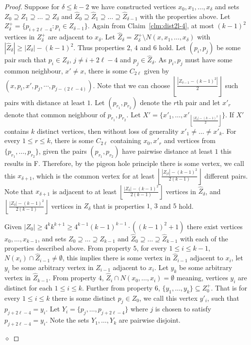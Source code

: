 \documentclass[runningheads,envcountsame]{llncs}
\newcommand{\forbiddenGraph}{F}
\newenvironment{claimproof}
{\noindent {\em Proof of Claim:} }
{\hfill $\diamond$ \smallskip}
\begin{document}
\begin{proof}
\begin{claimproof}
        Suppose for $\delta \leq k-2$ we have constructed vertices $x_0,x_1,\ldots,x_{\delta}$ and sets $Z_{0} \supseteq Z_1 \supseteq  \ldots \supseteq Z_{\delta}$ and $\hat{Z}_0 \supseteq \hat{Z}_1 \supseteq \ldots \supseteq \hat{Z}_{\delta-1}$ with the properties above. Let $Z^+_{\delta} = \{ p_{i+2\ell-4}: p_i \in Z_{\delta-1}\}$. Again from Claim~\ref{clm:dist2l-4}, at most $(k-1)^2$ vertices in $Z^+_{\delta}$ are adjacent to $x_{\delta}$. Let $\hat{Z}_{\delta} =Z^+_{\delta} \setminus N(x,x_1, \ldots, x_{\delta})$ with $|\hat{Z}_{\delta}| \geq |Z_{\delta}| -(k-1)^2$. Thus properties $2$, $4$ and $6$ hold.
        Let $(p_i,p_j)$ be some pair such that $p_i \in Z_{\delta}$, $j\not=i+2\ell-4$ and $p_j \in \hat{Z}_{\delta}$. As $p_i,p_j$ must have some common neighbour, $x' \neq x$, there is some $C_{2\ell}$ given by $(x,p_i, x', p_j, \cdots, p_{j-(2\ell-4)})$. Note that we can choose  $\left\lfloor {\frac{|Z_{\delta-1}- (k-1)^2|}{2}} \right\rfloor$ such pairs with distance at least $1$.
        Let $(p_{r_1},p_{r_2})$ denote the $r$th pair and let $x'_r$ denote that common neighbour of $p_{r_1},p_{r_2}$. Let $X' = \{x'_1,\dots, x'_{\left\lfloor {\frac{|Z_{\delta}|- (k-1)^2}{2}} \right\rfloor}\}$. If $X'$ contains $k$ distinct vertices, then without loss of generality $x'_1 \neq \ldots \neq x'_k$. For every $1 \leq r \leq k$, there is some $C_{2\ell}$ containing $x_0, x'_r$ and vertices from $\{p_{r_1}, \ldots, p_{r_2}\}$, given the pairs $(p_{r_1},p_{r_2})$ have pairwise distance at least $1$ this results in \forbiddenGraph. Therefore, by the pigeon hole principle there is some vertex, we call this $x_{\delta+1}$, which is the common vertex for at least $\left\lfloor {\frac{|Z_{|\delta}|- (k-1)^2}{2(k-1)}} \right\rfloor$ different pairs. Note that $x_{\delta+1}$ is adjacent to at least $\left\lfloor {\frac{|Z_{\delta}|- (k-1)^2}{2(k-1)}} \right\rfloor$ vertices in $\hat{Z}_{\delta}$, and $\left\lfloor {\frac{|Z_{\delta}|- (k-1)^2}{2(k-1)}} \right\rfloor$ vertices in $Z_{\delta}$ that is properties $1$, $3$ and $5$ hold.

        Given $|Z_0| \geq 4^kk^{k+1} \geq 4^{k-1}(k-1)^{k-1}\cdot ((k-1)^2+1)$ there exist vertices $x_0, \ldots, x_{k-1}$, and sets $Z_{0} \supseteq \ldots \supseteq Z_{k-1}$ and $\hat{Z}_{0} \supseteq \ldots \supseteq \hat{Z}_{k-1}$ with each of the properties described above. From property $5$, for every $1 \leq i \leq k-1$, $N(x_{i}) \cap \hat{Z}_{i-1} \neq \emptyset$, this implies there is some vertex in $\hat{Z}_{i-1}$ adjacent to $x_i$, let $y_i$ be some arbitrary vertex in $\hat{Z}_{i-1}$ adjacent to $x_i$. Let $y_k$ be some arbitrary vertex in $\hat{Z}_{k-1}$. From property $4$, $\hat{Z}_i\cap N(x_0,\dots, x_{i})=\emptyset$ meaning, vertices $y_i$ are distinct for each $1 \leq i \leq k$. Further from property $6$, $\{y_1, \ldots, y_k\} \subseteq Z^+_0$. That is for every $1 \leq i \leq k$ there is some distinct $p_j \in Z_0$, we call this vertex $y'_i$, such that $p_{j+2\ell-4} = y_i$. Let $Y_i = \{p_{j}, \ldots, p_{j+2\ell-4}\}$ where $j$ is chosen to satisfy $p_{j+2\ell-4}=y_i$. Note the sets $Y_1, \ldots, Y_k$ are pairwise disjoint.


\end{claimproof}
\end{proof}
\end{document}
